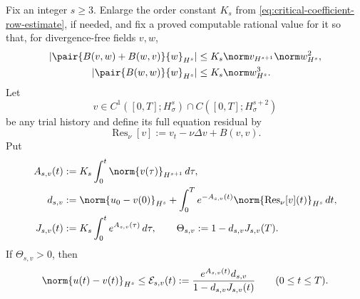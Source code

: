 \begin{proposition}
\label{prop:residual-certificate}
Fix an integer \(s\ge3\).  Enlarge the order constant \(K_s\) from
\eqref{eq:critical-coefficient-row-estimate}, if needed, and fix a proved
computable rational value for it so that, for divergence-free fields \(v,w\),
\begin{align}
 \left|\pair{B(v,w)+B(w,v)}{w}_{H^s}\right|
 &\le K_s\norm v_{H^{s+1}}\norm w_{H^s}^2,
 \notag\\
 \left|\pair{B(w,w)}{w}_{H^s}\right|
 &\le K_s\norm w_{H^s}^3.
 \label{eq:certificate-stability-products}
\end{align}
Let
\[
 v\in C^1([0,T];H_\sigma^s)
       \cap C([0,T];H_\sigma^{s+2})
\]
be any trial history and define its full equation residual by
\begin{equation}
 \operatorname{Res}_\nu[v]
 :=v_t-\nu\Delta v+B(v,v).
 \label{eq:certificate-residual}
\end{equation}
Put
\begin{align}
 A_{s,v}(t)
 &:=K_s\int_0^t\norm{v(\tau)}_{H^{s+1}}\,d\tau,
 \notag\\
 d_{s,v}
 &:=\norm{u_0-v(0)}_{H^s}
 +\int_0^T e^{-A_{s,v}(t)}
   \norm{\operatorname{Res}_\nu[v](t)}_{H^s}\,dt,
 \notag\\
 J_{s,v}(t)
 &:=K_s\int_0^t e^{A_{s,v}(\tau)}\,d\tau,
 \qquad
 \Theta_{s,v}:=1-d_{s,v}J_{s,v}(T).
 \label{eq:certificate-data}
\end{align}
If \(\Theta_{s,v}>0\), then
\begin{equation}
 \norm{u(t)-v(t)}_{H^s}
 \le
 \mathcal E_{s,v}(t)
 :=
 \frac{e^{A_{s,v}(t)}d_{s,v}}
 {1-d_{s,v}J_{s,v}(t)}
 \qquad(0\le t\le T).
 \label{eq:certificate-error-envelope}
\end{equation}


\end{proposition}
